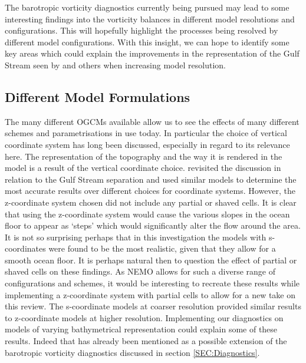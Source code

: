 \documentclass[..\report.tex]{subfiles}
\begin{document}
The barotropic vorticity diagnostics currently being pursued may lead to some interesting findings into the vorticity balances in different model resolutions and configurations. This will hopefully highlight the processes being resolved by different model configurations. With this insight, we can hope to identify some key areas which could explain the improvements in the representation of the Gulf Stream seen by \citet{Scaife2011a} and others when increasing model resolution.


\subsection{Different Model Formulations}
\label{SSEC:DifferentModelFormulations}

The many different \glspl{OGCM} available allow us to see the effects of many different schemes and parametrisations in use today. In particular the choice of vertical coordinate system has long been discussed, especially in regard to its relevance here.
The representation of the topography and the way it is rendered in the model is a result of the vertical coordinate choice.
\citet{Ezer2016b} revisited the discussion in relation to the Gulf Stream separation and used similar models to determine the most accurate results over different choices for coordinate systems. However, the z-coordinate system chosen did not include any partial or shaved cells.
It is clear that using the z-coordinate system would cause the various slopes in the ocean floor to appear as `steps' which would significantly alter the flow around the area.
It is not so surprising perhaps that in this investigation the models with s-coordinates were found to be the most realistic, given that they allow for a smooth ocean floor.
It is perhaps natural then to question the effect of partial or shaved cells on these findings. As \gls{NEMO} allows for such a diverse range of configurations and schemes, it would be interesting to recreate these results while implementing a z-coordinate system with partial cells to allow for a new take on this review.
The s-coordinate models at coarser resolution provided similar results to z-coordinate models at higher resolution. Implementing our diagnostics on models of varying bathymetrical representation could explain some of these results.
Indeed that has already been mentioned as a possible extension of the barotropic vorticity diagnostics discussed in section \ref{SEC:Diagnostics}.\\
\end{document}
